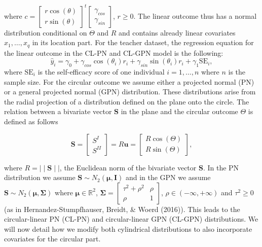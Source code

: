 \documentclass[12pt,]{article}
\begin{document}
\noindent where
\(c = \begin{bmatrix} r \cos(\theta) \\ r\sin(\theta) \end{bmatrix}^t \begin{bmatrix} \gamma_{cos} \\ \gamma_{sin} \end{bmatrix}\),
\(r \geq 0\). The linear outcome thus has a normal distribution
conditional on \(\Theta\) and \(R\) and contains already linear
covariates \(x_1, \dots, x_q\) in its location part. For the teacher
dataset, the regression equation for the linear outcome in the CL-PN and
CL-GPN model is the following: \[\hat{y}_i =
\gamma_0 + \gamma_{cos}\cos(\theta_i)r_i + \gamma_{sin}\sin(\theta_i)r_i +
\gamma_1\text{SE}_i,\] \noindent where \(\text{SE}_i\) is the
self-efficacy score of one individual \(i = 1, \dots, n\) where \(n\) is
the sample size.\newline
\indent For the circular outcome we assume either a projected normal
(PN) or a general projected normal (GPN) distribution. These
distributions arise from the radial projection of a distribution defined
on the plane onto the circle. The relation between a bivariate vector
\(\boldsymbol{S}\) in the plane and the circular outcome \(\Theta\) is
defined as follows

\begin{equation}\label{projection}
\boldsymbol{S} = \begin{bmatrix} S^{I} \\ S^{II} \end{bmatrix} = R\boldsymbol{u} = \begin{bmatrix} R \cos (\Theta) \\  R\sin (\Theta) \end{bmatrix},
\end{equation}

\noindent where \(R = \mid\mid \boldsymbol{S} \mid\mid\), the Euclidean
norm of the bivariate vector \(\boldsymbol{S}\). In the PN distribution
we assume \(\boldsymbol{S} \sim N_2(\boldsymbol{\mu}, \boldsymbol{I})\)
and in the GPN we assume
\(\boldsymbol{S} \sim N_2(\boldsymbol{\mu}, \boldsymbol{\Sigma})\) where
\(\boldsymbol{\mu} \in \mathbb{R}^2\),
\(\boldsymbol{\Sigma} = \begin{bmatrix} \tau^2 + \rho^2 & \rho\\ \rho & 1 \end{bmatrix}\),
\(\rho \in (-\infty, +\infty)\) and \(\tau^2 \geq 0\) (as in
Hernandez-Stumpfhauser, Breidt, \& Woerd (2016)). This leads to the
circular-linear PN (CL-PN) and circular-linear GPN (CL-GPN)
distributions. We will now detail how we modify both cylindrical
distributions to also incorporate covariates for the circular part.
\end{document}
